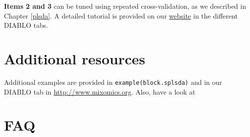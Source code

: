 \documentclass[]{book}
\begin{document}
\textbf{Items 2 and 3} can be tuned using repeated cross-validation, as we described in Chapter \ref{plsda}. A detailed tutorial is provided on our \href{http://mixomics.org/mixdiablo/}{website} in the different DIABLO tabs.

\hypertarget{additional-resources-3}{%
\section{Additional resources}\label{additional-resources-3}}

Additional examples are provided in \texttt{example(block.splsda)} and in our DIABLO tab in \url{http://www.mixomics.org}. Also, have a look at \citep{Sin16}

\hypertarget{faq-3}{%
\section{FAQ}\label{faq-3}}
\end{document}
